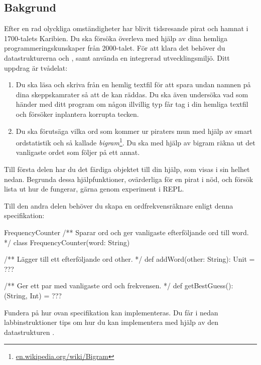 \subsection{Bakgrund}


Efter en rad olyckliga omständigheter har blivit tidsresande pirat och hamnat i 1700-talets Karibien. Du ska försöka överleva med hjälp av dina hemliga programmeringskunskaper från 2000-talet. För att klara det behöver du datastrukturerna  och , samt använda en integrerad utvecklingsmiljö.
Ditt uppdrag är tvådelat:
\begin{enumerate}
\item Du ska läsa och skriva från en hemlig textfil för att spara undan namnen på dina skeppskamrater så att de kan räddas. Du ska även undersöka vad som händer med ditt program om någon illvillig typ får tag i din hemliga textfil och försöker inplantera korrupta tecken.
\item Du ska förutsäga vilka ord som kommer ur piraters mun med hjälp av smart ordstatistik och så kallade \emph{bigram}\footnote{\href{https://en.wikipedia.org/wiki/Bigram}{en.wikipedia.org/wiki/Bigram}}. Du ska med hjälp av bigram räkna ut det vanligaste ordet som följer på ett annat.  
\end{enumerate}


Till första delen har du det färdiga objektet  till din hjälp, som visas i sin helhet nedan. Begrunda dessa hjälpfunktioner, ovärderliga för en pirat i nöd, och försök lista ut hur de fungerar, gärna genom experiment i REPL.

\noindent Till den andra delen behöver du skapa en ordfrekvensräknare enligt denna specifikation:
\begin{ScalaSpec}{FrequencyCounter}
  /** Sparar ord och ger vanligaste efterföljande ord till word. */
  class FrequencyCounter(word: String) {
    
    /** Lägger till ett efterföljande ord other. */
    def addWord(other: String): Unit = ???    
    
    /** Ger ett par med vanligaste ord och frekvensen. */ 
    def getBestGuess(): (String, Int) =  ???
    
  }
\end{ScalaSpec}
Fundera på hur ovan specifikation kan implementeras. Du får i nedan labbinstruktioner tips om hur du kan implementera  med hjälp av den datastrukturen .

